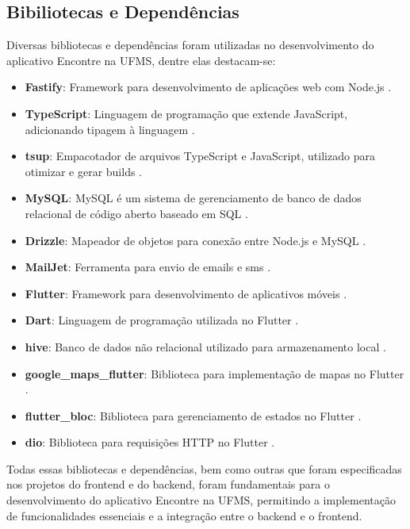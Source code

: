 \subsection{Bibiliotecas e Dependências}
    Diversas bibliotecas e dependências foram utilizadas no desenvolvimento do aplicativo Encontre na UFMS, dentre elas destacam-se:
    
    \begin{itemize}
      \item \textbf{Fastify}: Framework para desenvolvimento de aplicações web com Node.js \cite{fastify}.
      \item \textbf{TypeScript}: Linguagem de programação que extende JavaScript, adicionando tipagem à linguagem \cite{typescript}.
      \item \textbf{tsup}: Empacotador de arquivos TypeScript e JavaScript, utilizado para otimizar e gerar builds \cite{tsup}.
      \item \textbf{MySQL}: MySQL é um sistema de gerenciamento de banco de dados relacional de código aberto baseado em SQL \cite{mysql}.
      \item \textbf{Drizzle}: Mapeador de objetos para conexão entre Node.js e MySQL \cite{drizzle}.
      \item \textbf{MailJet}: Ferramenta para envio de emails e sms \cite{mailjet}.
      \item \textbf{Flutter}: Framework para desenvolvimento de aplicativos móveis \cite{flutter}.
      \item \textbf{Dart}: Linguagem de programação utilizada no Flutter \cite{dart}.
      \item \textbf{hive}: Banco de dados não relacional utilizado para armazenamento local \cite{hive}.
      \item \textbf{google\_maps\_flutter}: Biblioteca para implementação de mapas no Flutter \cite{googlemapsflutter}.
      \item \textbf{flutter\_bloc}: Biblioteca para gerenciamento de estados no Flutter \cite{flutterbloc}.
      \item \textbf{dio}: Biblioteca para requisições HTTP no Flutter \cite{dio}.
    \end{itemize}
    
    Todas essas bibliotecas e dependências, bem como outras que foram especificadas nos projetos do frontend e do backend, foram fundamentais para o desenvolvimento do aplicativo Encontre na UFMS, permitindo a implementação de funcionalidades essenciais e a integração entre o backend e o frontend.

